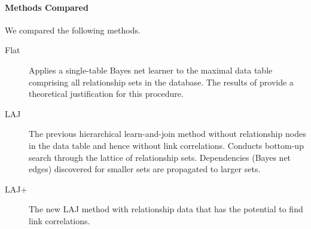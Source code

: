 \documentclass{article}
\begin{document}


\paragraph{Methods Compared}

We compared the following methods.

\begin{description}
\item[Flat] Applies a single-table Bayes net learner to the maximal data table comprising all relationship sets in the database.  The results of \cite{Schulte2011} provide a theoretical justification for this procedure.
\item[LAJ] The previous hierarchical learn-and-join method \cite{Schulte2012} without relationship nodes in the data table and hence without link correlations. Conducts bottom-up  search
through the lattice of relationship sets. Dependencies (Bayes net edges) discovered for smaller sets are propagated to larger sets. 
\item[LAJ+] The new LAJ method with relationship data that has the potential to find link correlations.

\end{description}
\end{document}
